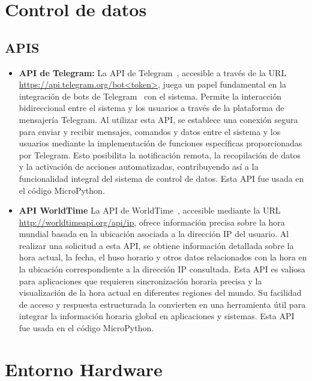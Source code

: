 \section{Control de datos}
\subsection{APIS}\label{4:APIS}
\begin{itemize}
    \item \textbf{API de Telegram:}
La API de Telegram~\cite{misc:Telegram_api}, accesible a través de la URL \url{https://api.telegram.org/bot<token>}, juega un papel fundamental en la integración de bots de Telegram~\cite{misc:Telegram_bots} con el sistema. Permite la interacción bidireccional entre el sistema y los usuarios a través de la plataforma de mensajería Telegram. Al utilizar esta API, se establece una conexión segura para enviar y recibir mensajes, comandos y datos entre el sistema y los usuarios mediante la implementación de funciones específicas proporcionadas por Telegram. Esto posibilita la notificación remota, la recopilación de datos y la activación de acciones automatizadas, contribuyendo así a la funcionalidad integral del sistema de control de datos.
Esta API fue usada en el código MicroPython.
    \item \textbf{API WorldTime}\label{4:API_Hora}
		La API de WorldTime~\cite{misc:WorlTimeAPI}, accesible mediante la URL \url{http://worldtimeapi.org/api/ip}, ofrece información precisa sobre la hora mundial basada en la ubicación asociada a la dirección IP del usuario. Al realizar una solicitud a esta API, se obtiene información detallada sobre la hora actual, la fecha, el huso horario y otros datos relacionados con la hora en la ubicación correspondiente a la dirección IP consultada. Esta API es valiosa para aplicaciones que requieren sincronización horaria precisa y la visualización de la hora actual en diferentes regiones del mundo. Su facilidad de acceso y respuesta estructurada la convierten en una herramienta útil para integrar la información horaria global en aplicaciones y sistemas.
Esta API fue usada en el código MicroPython.
\end{itemize}

\section{Entorno Hardware}
